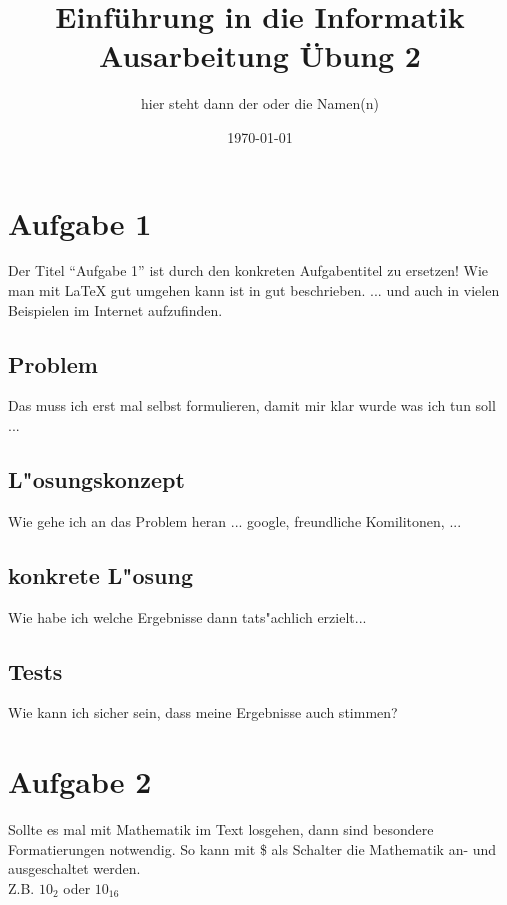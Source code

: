\documentclass[a4paper,11pt,titlepage]{article}
\begin{document}
\title{Einf\"uhrung in die Informatik\\
Ausarbeitung \"Ubung 2}


\author{hier steht dann der oder die Namen(n)}


\date{\today}

\maketitle{\thispagestyle{plain}}

\section{Aufgabe 1}
Der Titel "`Aufgabe 1"' ist durch den konkreten Aufgabentitel zu ersetzen!
Wie man mit LaTeX gut umgehen kann ist in \cite{lkurz} gut beschrieben.
... und auch in vielen Beispielen im Internet aufzufinden.

\subsection{Problem}
Das muss ich erst mal selbst formulieren, damit mir klar wurde was ich tun soll ...
\subsection{L"osungskonzept}
Wie gehe ich an das Problem heran ... google, freundliche Komilitonen, ...
\subsection{konkrete L"osung}
Wie habe ich welche Ergebnisse dann tats"achlich erzielt...
\subsection{Tests}
Wie kann ich sicher sein, dass meine Ergebnisse auch stimmen?

\section{Aufgabe 2}
Sollte es mal mit Mathematik im Text losgehen, dann sind besondere
Formatierungen notwendig. So kann mit \$ als Schalter die Mathematik
an- und ausgeschaltet werden.\\
Z.B. $10_2$ oder $10_{16}$
\end{document}
